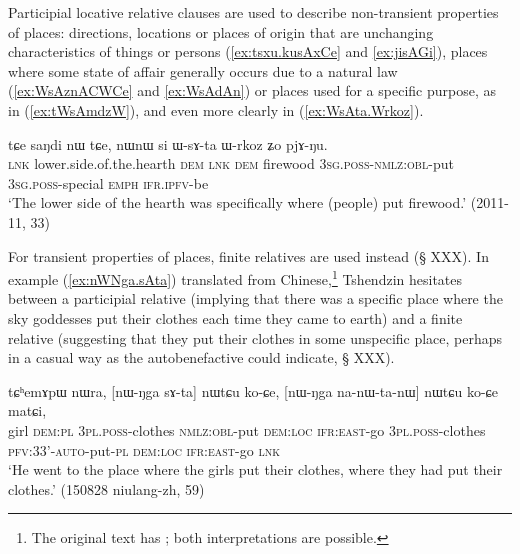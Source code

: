 Participial locative relative clauses are used to describe non-transient properties of places: directions, locations or places of origin that are unchanging characteristics of things or persons (\ref{ex:tsxu.kusAxCe} and \ref{ex:jisAGi}), places where some state of affair generally occurs due to a natural law (\ref{ex:WsAznACWCe} and \ref{ex:WsAdAn}) or places used for a specific purpose, as in (\ref{ex:tWsAmdzW}), and even more clearly in (\ref{ex:WsAta.Wrkoz}).

\begin{exe}
\ex \label{ex:WsAta.Wrkoz}
\gll tɕe saŋdi nɯ tɕe, nɯnɯ si ɯ-sɤ-ta ɯ-rkoz ʑo pjɤ-ŋu. \\
  \textsc{lnk} lower.side.of.the.hearth \textsc{dem} \textsc{lnk} \textsc{dem} firewood \textsc{3sg}.\textsc{poss}-\textsc{nmlz}:\textsc{obl}-put \textsc{3sg}.\textsc{poss}-special \textsc{emph} \textsc{ifr}.\textsc{ipfv}-be \\
\glt `The lower side of the hearth was specifically where (people) put firewood.' (2011-11, 33)
\end{exe}


For transient properties of places, finite relatives are used instead (§ XXX). In example (\ref{ex:nWNga.sAta}) translated from Chinese,\footnote{The original text has ; both interpretations are possible. }  Tshendzin hesitates between a participial relative (implying that there was a specific place where the sky goddesses put their clothes each time they came to earth) and a finite relative (suggesting that they put their clothes in some unspecific place, perhaps in a casual way as the autobenefactive  could indicate, § XXX).

\begin{exe}
\ex \label{ex:nWNga.sAta}
\gll tɕʰemɤpɯ nɯra, [nɯ-ŋga sɤ-ta] nɯtɕu ko-ɕe, [nɯ-ŋga na-nɯ-ta-nɯ] nɯtɕu ko-ɕe matɕi, \\
girl \textsc{dem}:\textsc{pl} \textsc{3pl}.\textsc{poss}-clothes \textsc{nmlz}:\textsc{obl}-put \textsc{dem}:\textsc{loc} \textsc{ifr}:\textsc{east}-go \textsc{3pl}.\textsc{poss}-clothes \textsc{pfv}:3\fl{}3'-\textsc{auto}-put-\textsc{pl} \textsc{dem}:\textsc{loc} \textsc{ifr}:\textsc{east}-go \textsc{lnk} \\
\glt `He went to the place where the girls put their clothes, where they had put their clothes.' (150828 niulang-zh, 59)
\end{exe}

